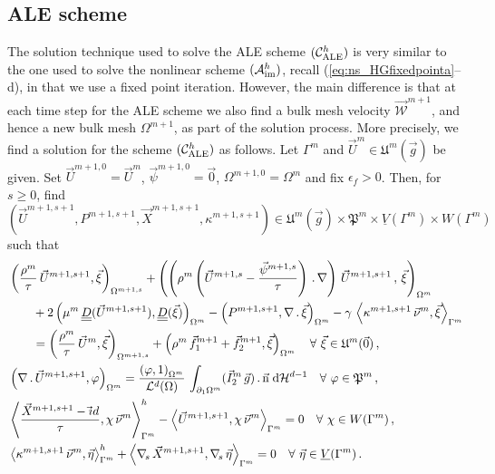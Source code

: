 \documentclass[a4paper,12pt,onecolumn]{article}
\newcommand{\W}{\vec{\mathcal W}}
\newcommand{\vol}{\mathcal{L}^d}
\newcommand{\dH}[1]{\;{\rm d}{\cal H}^{#1}} %
\newcommand{\Vh}{\underline{V}(\Gamma^m)}
\newcommand{\Wh}{W(\Gamma^m)}
\newcommand{\uspacediscale}[2]{\mathfrak{U}^{#2}(\vec{#1})} %
\newcommand{\pspaceale}{\mathfrak{P}} %
\newcommand{\nabs}{\nabla_{\!s}}
\newcommand{\id}{\rm id}
\newcommand{\unitn}{\vec{\rm n}}
\newcommand{\mat}[1]{\underline{\underline{#1}}\rule{0pt}{0pt}}
\newcommand{\schemeAim}{{\mathcal{A}^h_{\rm im}}}
\newcommand{\schemeALE}{{\mathcal{C}^h_{\rm ALE}}}
\begin{document}
\subsection{ALE scheme} \label{sec:ale_solution_method}
The solution technique used to solve the ALE scheme $(\schemeALE)$ is
very similar to the one used to solve the nonlinear scheme $(\schemeAim)$,
recall (\ref{eq:ns_HGfixedpointa}--d), in that we use a fixed point iteration.
However, the main difference is that at each time step for the ALE scheme we
also find a bulk mesh velocity $\W^{m+1}$, and hence a new bulk mesh
$\Omega^{m+1}$, as part of the solution process.
More precisely, we find a solution for the scheme $(\schemeALE)$ as follows.
Let $\Gamma^m$ and $\vec U^m\in \uspacediscale{g}{m}$ be given.
Set $\vec U^{m+1,0}=\vec U^m$, $\vec \psi^{m+1,0} =
\vec 0$, $\Omega^{m+1,0}=\Omega^m$ and fix $\epsilon_f > 0$.
Then, for $s \geq 0$,
find $(\vec U^{m+1,s+1},P^{m+1,s+1}, \vec X^{m+1,s+1}, \kappa^{m+1,s+1}) \in
\uspacediscale{g}{m}\times \pspaceale^m \times \Vh \times \Wh$ such that
\begin{subequations}
\begin{align}
& \left( \frac{\rho^m}{\tau}\,\vec U^{m+1,s+1}, \vec
\xi\right)_{\Omega^{m+1,s}} + \left(\left(\rho^m\left(\vec
U^{m+1,s}-\frac{\vec\psi^{m+1,s}}{\tau}\right)\,.\,\nabla\right)\,
\vec U^{m+1,s+1}\,, \,\vec \xi \right)_{\Omega^m}\nonumber \\
& \qquad + 2\left(\mu^m\,\mat D(\vec U^{m+1,s+1}), \mat D(\vec \xi)
\right)_{\Omega^m} - \left(P^{m+1,s+1}, \nabla\,.\,\vec \xi\right)_{\Omega^m}
- \gamma\,\left\langle \kappa^{m+1,s+1}\,\vec\nu^m,
\vec\xi\right\rangle_{\Gamma^m} \nonumber \\
& \qquad = \left(\frac{\rho^m}{\tau}\,\vec U^m,\vec \xi
\right)_{\Omega^{m+1,s}}
+ \left(\rho^m\,\vec f_1^{m+1}+\vec f_2^{m+1}, \vec \xi\right)_{\Omega^m}
\quad \forall\ \vec\xi \in \uspacediscale{0}{m}\,, \label{eq:ns_HGalea} \\
& \left(\nabla\,.\,\vec U^{m+1,s+1}, \varphi\right)_{\Omega^m} =
 \frac{\left(\varphi, 1\right)_{\Omega^m}}{\vol(\Omega)}\,
\int_{\partial_1\Omega^m} (\vec I^m_2\,\vec g) \,.\, \unitn \dH{d-1}
\quad \forall\ \varphi \in \pspaceale^m\,,\label{eq:ns_HGaleb} \\
& \left\langle \frac{\vec X^{m+1,s+1} - \vec\id}{\tau} ,\chi\,\vec\nu^m
\right\rangle_{\Gamma^m}^h - \left\langle \vec U^{m+1,s+1}, \chi\,\vec\nu^m
\right\rangle_{\Gamma^m} = 0 \quad \forall\ \chi \in \Wh\,,
\label{eq:ns_HGalec}\\
& \left\langle \kappa^{m+1,s+1}\,\vec\nu^m, \vec\eta \right\rangle_{\Gamma^m}^h
+ \left\langle \nabs\,\vec X^{m+1,s+1}, \nabs\,\vec \eta
\right\rangle_{\Gamma^m} = 0 \quad \forall\ \vec\eta \in \Vh\,.
\label{eq:ns_HGaled}
\end{align}
\end{subequations}
\end{document}
